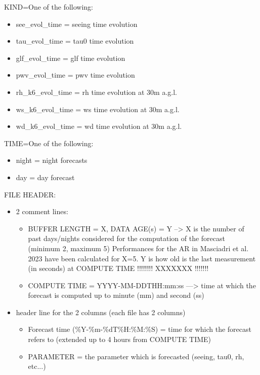 KIND=One of the following:
\begin{itemize}
\item    see\_evol\_time = seeing time evolution
\item    tau\_evol\_time = tau0 time evolution
\item    glf\_evol\_time = glf time evolution
\item    pwv\_evol\_time = pwv time evolution
\item    rh\_k6\_evol\_time = rh time evolution at 30m a.g.l.
\item    ws\_k6\_evol\_time = ws time evolution at 30m a.g.l.
\item    wd\_k6\_evol\_time = wd time evolution at 30m a.g.l.
\end{itemize}
TIME=One of the following:
\begin{itemize}
\item    night = night forecasts
\item    day = day forecast
\end{itemize}

FILE HEADER:
\begin{itemize}
\item        2 comment lines:
  \begin{itemize}
  \item                BUFFER LENGTH = X, DATA AGE(s) = Y --> X is the number of past days/nights considered for the computation of the forecast (minimum 2, maximum 5)
                                                       Performances for the AR in Masciadri et al. 2023 have been calculated for X=5.
                                                       Y is how old is the last measurement (in seconds) at COMPUTE TIME  !!!!!!!!   XXXXXXX  !!!!!!!
  \item                COMPUTE TIME = YYYY-MM-DDTHH:mm:ss  ---> time at which the forecast is computed up to minute (mm) and second (ss)
  \end{itemize}
\item        header line for the 2 columns (each file has 2 columns)
  \begin{itemize}
  \item                Forecast time (\%Y-\%m-\%dT\%H:\%M:\%S) = time for which the forecast refers to (extended up to 4 hours from COMPUTE TIME)
  \item                PARAMETER = the parameter which is forecasted (seeing, tau0, rh, etc...)
  \end{itemize}
\end{itemize}
%

